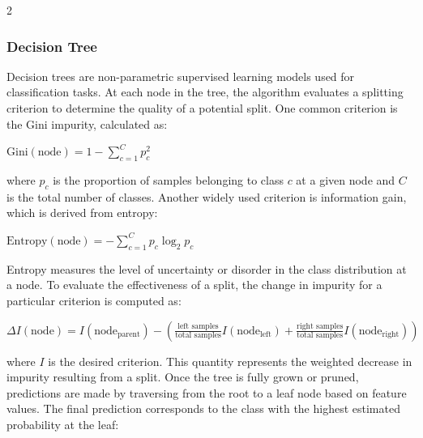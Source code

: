 \documentclass[bst/sn-nature]{sn-jnl}
\begin{document}
\begin{multicols}{2}
\subsubsection{Decision Tree\cite{decisiontrees}}

\quad Decision trees are non-parametric supervised learning models used for classification tasks. At each node in the tree, the algorithm evaluates a splitting criterion to determine the quality of a potential split. One common criterion is the Gini impurity, calculated as: \\ 

\begin{center}
    $\text{Gini}(\text{node}) = 1 - \sum^{C}_{c=1} p^2_c$ \vspace{0.3cm}
\end{center}

where $p_c$ is the proportion of samples belonging to class $c$ at a given node and $C$ is the total number of classes. Another widely used criterion is information gain, which is derived from entropy: \\

\begin{center}
    $\text{Entropy}(\text{node}) = - \sum^{C}_{c=1} p_c \log_2 p_c$ \vspace{0.3cm}
\end{center}

Entropy measures the level of uncertainty or disorder in the class distribution at a node. To evaluate the effectiveness of a split, the change in impurity for a particular criterion is computed as: \\ 

\begin{center}
    $\Delta I(\text{node}) = I(\text{node}_{\text{parent}}) - \left(\frac{\text{left samples}}{\text{total samples}} I(\text{node}_{\text{left}}) + \frac{\text{right samples}}{\text{total samples}} I(\text{node}_{\text{right}})\right)$ \vspace{0.3cm}
\end{center}

where $I$ is the desired criterion. This quantity represents the weighted decrease in impurity resulting from a split. Once the tree is fully grown or pruned, predictions are made by traversing from the root to a leaf node based on feature values. The final prediction corresponds to the class with the highest estimated probability at the leaf: \\


\end{multicols}
\end{document}
